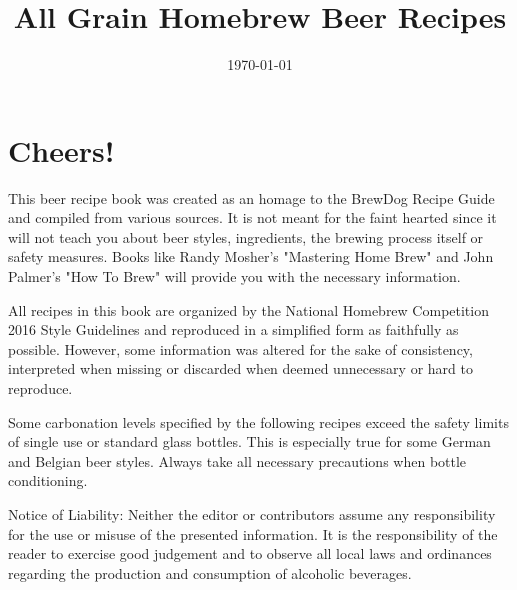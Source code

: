 \documentclass[parskip=half,fontsize=9pt,oneside,toc=chapterentrydotfill]{scrbook}
\begin{document}
\title{All Grain Homebrew Beer Recipes}
\date{\today}
\publishers{Editor: Thomas Ascher}
\dedication{Dedicated to BrauCampus Graz Hobbybrauer Stammtisch}
\maketitle

\frontmatter

\chapter*{Cheers!}

This beer recipe book was created as an homage to the BrewDog Recipe
Guide and compiled from various sources. It is not meant for the faint hearted
since it will not teach you about beer styles, ingredients, the brewing
process itself or safety measures. Books like Randy Mosher's "Mastering Home Brew"
and John Palmer's "How To Brew" will provide you with the necessary information.

All recipes in this book are organized by the National Homebrew Competition
2016 Style Guidelines and reproduced in a simplified form as faithfully
as possible. However, some information was altered for the sake of consistency,
interpreted when missing or discarded when deemed unnecessary or hard to reproduce.

Some carbonation levels specified by the following recipes exceed the safety
limits of single use or standard glass bottles. This is especially true for some
German and Belgian beer styles. Always take all necessary precautions when
bottle conditioning.

Notice of Liability: Neither the editor or contributors assume any responsibility
for the use or misuse of the presented information. It is the responsibility of
the reader to exercise good judgement and to observe all local laws and ordinances
regarding the production and consumption of alcoholic beverages.

\clearpage
{}
\tableofcontents

\mainmatter









\end{document}
